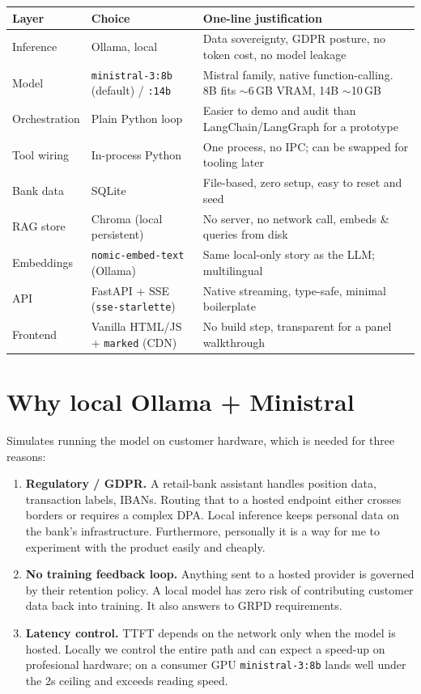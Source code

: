 \documentclass[11pt]{article}
\begin{document}
\begin{longtable}{@{}p{2.6cm}p{4.4cm}p{7.5cm}@{}}
\toprule
\textbf{Layer} & \textbf{Choice} & \textbf{One-line justification} \\
\midrule
\endhead
Inference & Ollama, local & Data sovereignty, GDPR posture, no token cost, no model leakage \\
Model & \texttt{ministral-3:8b} (default) / \texttt{:14b} & Mistral family, native function-calling. 8B fits $\sim$6\,GB VRAM, 14B $\sim$10\,GB \\
Orchestration & Plain Python loop & Easier to demo and audit than LangChain/LangGraph for a prototype \\
Tool wiring & In-process Python & One process, no IPC; can be swapped for tooling later \\
Bank data & SQLite & File-based, zero setup, easy to reset and seed \\
RAG store & Chroma (local persistent) & No server, no network call, embeds \& queries from disk \\
Embeddings & \texttt{nomic-embed-text} (Ollama) & Same local-only story as the LLM; multilingual \\
API & FastAPI + SSE (\texttt{sse-starlette}) & Native streaming, type-safe, minimal boilerplate \\
Frontend & Vanilla HTML/JS + \texttt{marked} (CDN) & No build step, transparent for a panel walkthrough \\
\bottomrule
\end{longtable}

\section{Why local Ollama + Ministral}

Simulates running the model on customer hardware, which is needed for three reasons:

\begin{enumerate}[leftmargin=*]
  \item \textbf{Regulatory / GDPR.} A retail-bank assistant handles position data, transaction labels, IBANs. Routing that to a hosted endpoint either crosses borders or requires a complex DPA. Local inference keeps personal data on the bank's infrastructure. Furthermore, personally it is a way for me to experiment with the product easily and cheaply.
  \item \textbf{No training feedback loop.} Anything sent to a hosted provider is governed by their retention policy. A local model has zero risk of contributing customer data back into training. It also answers to GRPD requirements.
  \item \textbf{Latency control.} TTFT depends on the network only when the model is hosted. Locally we control the entire path and can expect a speed-up on profesional hardware; on a consumer GPU \texttt{ministral-3:8b} lands well under the 2s ceiling and exceeds reading speed.
\end{enumerate}
\end{document}
